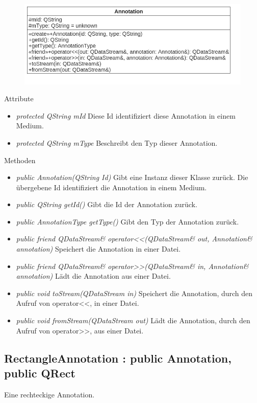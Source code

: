 \begin{figure}[H]
\centering
\includegraphics[scale=0.5]{img/Klassendiagramm/Klassen/Annotation}
\label{fig:annotation}
\end{figure}

Attribute
\begin{itemize}
\item\textit{protected QString mId} Diese Id identifiziert diese Annotation in einem  Medium.
\item\textit{protected QString mType} Beschreibt den Typ dieser Annotation.
\end{itemize}

Methoden
\begin{itemize}
\item \textit{public Annotation(QString Id)} Gibt eine Instanz dieser Klasse zurück. Die übergebene Id identifiziert die Annotation in einem Medium.
\item \textit{public QString getId()} Gibt die Id der Annotation zurück.
\item \textit{public AnnotationType getType()} Gibt den Typ der Annotation zurück.
\item \textit{public friend QDataStream\& operator<<(QDataStream\& out, Annotation\& annotation)} Speichert die Annotation in einer Datei.
\item \textit{public friend QDataStream\& operator>>(QDataStream\& in, Annotation\& annotation)} Lädt die Annotation aus einer Datei.
\item \textit{public void toStream(QDataStream in)} Speichert die Annotation, durch den Aufruf von operator<<, in einer Datei.
\item \textit{public void fromStream(QDataStream out)} Lädt die Annotation, durch den Aufruf von operator>>, aus einer Datei.
\end{itemize}

\subsection*{RectangleAnnotation : public Annotation, public QRect}
Eine rechteckige Annotation.

